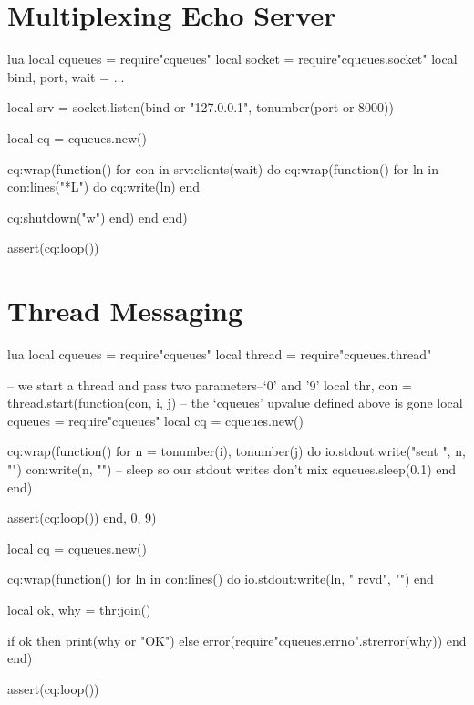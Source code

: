 \documentclass[11pt, oneside]{memoir}
\begin{document}
\clearpage
\section{Multiplexing Echo Server}

\begin{example}{lua}
local cqueues = require"cqueues"
local socket = require"cqueues.socket"
local bind, port, wait = ...

local srv = socket.listen(bind or "127.0.0.1", tonumber(port or 8000))

local cq = cqueues.new()

cq:wrap(function()
	for con in srv:clients(wait) do
		cq:wrap(function()
			for ln in con:lines("*L") do
				cq:write(ln)
			end

			cq:shutdown("w")
		end)
	end
end)

assert(cq:loop())
\end{example}

\clearpage
\section{Thread Messaging}

\begin{example}{lua}
local cqueues = require"cqueues"
local thread = require"cqueues.thread"

-- we start a thread and pass two parameters--`0' and '9'
local thr, con = thread.start(function(con, i, j)
	-- the `cqueues' upvalue defined above is gone
	local cqueues = require"cqueues"
	local cq = cqueues.new()

	cq:wrap(function()
		for n = tonumber(i), tonumber(j) do
			io.stdout:write("sent ", n, "\n")
			con:write(n, "\n")
			 -- sleep so our stdout writes don't mix
			cqueues.sleep(0.1)
		end
	end)

	assert(cq:loop())
end, 0, 9)


local cq = cqueues.new()

cq:wrap(function()
	for ln in con:lines() do
		io.stdout:write(ln, " rcvd", "\n")
	end

	local ok, why = thr:join()

	if ok then
		print(why or "OK")
	else
		error(require"cqueues.errno".strerror(why))
	end
end)

assert(cq:loop())
\end{example}



\appendix
\printindex
\end{document}
